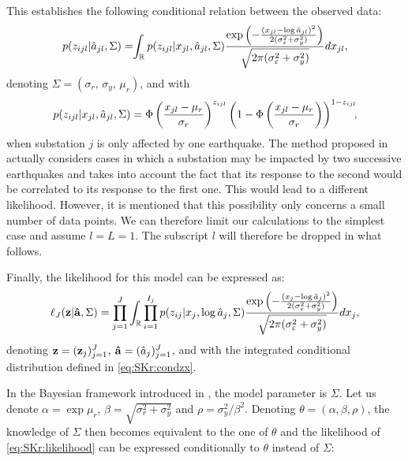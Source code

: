 This establishes the following conditional relation between the observed data:
    \begin{equation}
        p(z_{ijl}|\hat a_{jl},\Sigma) =\hspace*{-3pt} \int_{\mathbb{R}} p(z_{ijl}|x_{jl},\hat a_{jl},\Sigma)\frac{\exp\left({-\frac{(x_{jl}-\log\hat{a}_{jl})^2}{2(\sigma^2_\varepsilon+\sigma^2_y)}}\right)}{\sqrt{2\pi(\sigma_\varepsilon^2+\sigma_y^2)}}dx_{jl} ,
    \end{equation}
denoting $\Sigma=(\sigma_r,\,\sigma_y,\,\mu_r)$, and with 
    \begin{equation}\label{eq:SKr:condzx}
        p(z_{ijl}|x_{jl},\hat a_{jl},\Sigma) = \Phi\left(\frac{x_{jl}-\mu_r}{\sigma_r}\right)^{z_{ijl}}\left(1-\Phi\left(\frac{x_{jl}-\mu_r}{\sigma_r}\right)\right)^{1-z_{ijl}} \hspace*{-4pt} ,
    \end{equation}
when substation $j$ is only affected by one earthquake. The method proposed in \cite{straub_improved_2008} actually considers cases in which a substation may be impacted by two successive earthquakes and takes into account the fact that its response to the second would be correlated to its response to the first one. This would lead to a different likelihood. However, it is mentioned that this possibility only concerns a small number of data points. We can therefore limit our calculations to the simplest case and assume $l=L=1$. The subscript $l$ will therefore be dropped in what follows.

Finally, the likelihood for this model can be expressed as:
    \begin{equation}
    \label{eq:SKr:likelihood}
        \ell_J(\mathbf{z} | \mathbf{\hat a}, \Sigma)
            = \prod_{j=1}^J \int_{\mathbb{R}}\prod_{i=1}^{I_j} p(z_{ij}|x_{j},\log\hat a_{j},\Sigma) \frac{\exp\left({-\frac{(x_{j}-\log\hat{a}_{j})^2}{2(\sigma^2_\varepsilon+\sigma^2_y)}}\right)}{\sqrt{2\pi(\sigma_\varepsilon^2+\sigma_y^2)}}dx_{j}  ,
    \end{equation}
denoting $\mathbf{z}=(\mathbf{z}_j)_{j=1}^J$, $\mathbf{\hat a}=(\hat a_j)_{j=1}^J$, and with the integrated conditional distribution defined in \cref{eq:SKr:condzx}.


    In the Bayesian framework introduced in \cite{straub_improved_2008}, the model parameter is $\Sigma$. Let us denote 
    $\alpha=\exp\mu_r$, $\beta=\sqrt{\sigma_r^2+\sigma^2_y}$ and $\rho=\sigma^2_y/\beta^2$. Denoting $\theta=(\alpha,\beta,\rho)$, the knowledge of $\Sigma$ then becomes equivalent to the one of $\theta$ and the likelihood of \cref{eq:SKr:likelihood} can be expressed conditionally to $\theta$ instead of $\Sigma$:


